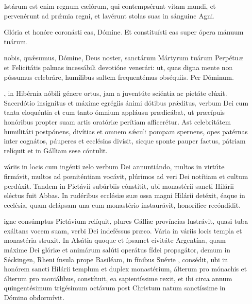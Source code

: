 \documentclass[fontsize=9pt,paper=A6,twoside,BCOR=1mm,DIV=22,headinclude]{scrarticle}
\renewcommand\A\Ant
\begin{document}
\begin{multicols}{2}
\A Istárum est enim regnum cælórum, qui contempsérunt vitam mundi, et pervenérunt ad prǽmia regni, et lavérunt stolas suas in sánguine Agni.

\V Glória et honóre coronásti eas, Dómine.
\R Et constituísti eas super ópera mánuum tuárum.

 nobis, quǽsumus, Dómine, Deus noster, sanctárum Mártyrum tuárum Perpétuæ et Felicitátis palmas incessábili devotióne venerári: ut, quas digna mente non póssumus celebráre, humílibus saltem frequentémus obséquiis. \red{(}Per Dóminum.\red{)}



\columnbreak
{
, in Hibérnia nóbili génere ortus, jam a juventúte sciéntia ac pietáte elúxit. Sacerdótio insignítus et máxime egrégiis ánimi dótibus pr\'æditus, verbum Dei cum tanta eloquéntia et cum tanto ómnium appláusu prædicábat, ut præcípuis honóribus propter suam artis oratóriæ perítiam afficerétur. Ast celebritátem humilitáti postpónens, divítias et omnem s\'æculi pompam spernens, opes patérnas inter cognátos, páuperes et ecclésias divísit, sicque sponte pauper factus, pátriam relíquit et in Gálliam sese cóntulit.

\RVCiv 

 váriis in locis cum ingénti zelo verbum Dei annuntiándo, multos in virtúte firmávit, multos ad pœniténtiam vocávit, plúrimos ad veri Dei notítiam et cultum perdúxit. Tandem in Pictávii subúrbiis cónstitit, ubi monastérii sancti Hilárii eléctus fuit Abbas. In rudéribus ecclésiæ suæ ossa magni Hilárii detéxit, éaque in ecclésia, quam delápsam una cum monastério instaurávit, honorífice recóndidit.

\RVCv 

 igne consúmptus Pictávium relíquit, plures Gálliæ províncias lustrávit, quasi tuba exáltans vocem suam, verbi Dei indeféssus præco. Vária in váriis locis templa et monastéria struxit. In Alsátia quoque et ípsamet civitáte Argentína, quam máxime Dei glóriæ et animárum salúti operátus fídei propagátor, demum in Séckingen, Rheni ínsula prope Basiléam, in fínibus Suévie , consédit, ubi in honórem sancti Hilárii templum et duplex monastérium, álterum pro mónachis et álterum pro moniálibus, constítuit, ea sapientíssime rexit, et ibi circa annum quingentésimum trigésimum octávum post Christum natum sanctíssime in Dómino obdormívit.

}
\end{multicols}
\end{document}
